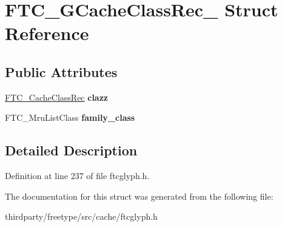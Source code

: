 \hypertarget{struct_f_t_c___g_cache_class_rec__}{}\section{F\+T\+C\+\_\+\+G\+Cache\+Class\+Rec\+\_\+ Struct Reference}
\label{struct_f_t_c___g_cache_class_rec__}
\subsection*{Public Attributes}
\begin{DoxyCompactItemize}
\item 
\mbox{\label{struct_f_t_c___g_cache_class_rec___a91a5ad92ca74eac46e2870622513b513}} 
\hyperlink{struct_f_t_c___cache_class_rec__}{F\+T\+C\+\_\+\+Cache\+Class\+Rec} {\bfseries clazz}
\item 
\mbox{\label{struct_f_t_c___g_cache_class_rec___a44faad0061882dfeecfa631381f65ae2}} 
F\+T\+C\+\_\+\+Mru\+List\+Class {\bfseries family\+\_\+class}
\end{DoxyCompactItemize}


\subsection{Detailed Description}


Definition at line 237 of file ftcglyph.\+h.



The documentation for this struct was generated from the following file\+:\begin{DoxyCompactItemize}
\item 
thirdparty/freetype/src/cache/ftcglyph.\+h\end{DoxyCompactItemize}
